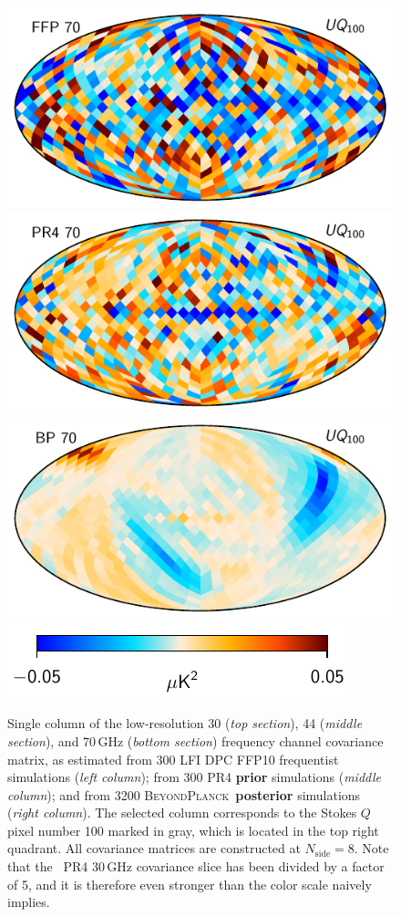 \documentclass[twocolumn]{aa}%
\newcommand{\BP}{\textsc{BeyondPlanck}}
\begin{document}
\begin{figure}[p]
  \includegraphics[width=0.33\linewidth]{figs/ncov_70_pixQ100_ffp10_U.pdf}  
  \includegraphics[width=0.33\linewidth]{figs/ncov_npipe70_pixQ100_BP10_U.pdf}
  \includegraphics[width=0.33\linewidth]{figs/ncov_70_pixQ100_BP10_U.pdf}\\
  \includegraphics[width=0.35\linewidth]{figs/colourbar_05uK.pdf}
  \caption{Single column of the low-resolution 30 (\emph{top
      section}), 44 (\emph{middle section}), and 70\,GHz (\emph{bottom
      section}) frequency channel covariance matrix, as estimated from
    300 LFI DPC FFP10 frequentist simulations (\emph{left column}); from
    300 PR4 {\bf prior} simulations (\emph{middle column}); and from
    3200 \BP\ {\bf posterior} simulations (\emph{right column}). The selected
    column corresponds to the Stokes $Q$ pixel number 100 marked in gray, which
    is located in the top right quadrant. All 
    covariance matrices are constructed at $N_{\mathrm{side}}=8$. 
    Note that the \Planck\ PR4 30\,GHz covariance slice
    has been divided by a factor of 5, and it is therefore even stronger
    than the color scale naively implies.}
  \label{fig:ncov}
\end{figure}
\end{document}
